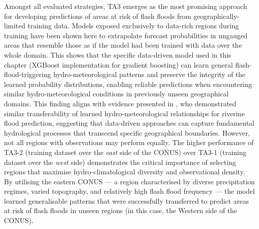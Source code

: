 Amongst  all evaluated strategies, TA3 emerges as the most promising approach for developing predictions of areas at risk of flash floods from geographically-limited training data. Models exposed exclusively to data-rich regions during training have been shown here to extrapolate forecast probabilities in ungauged areas that resemble those as if the model had been trained with data over the whole domain. This shows that the specific data-driven model used in this chapter (XGBoost implementation for gradient boosting) can learn general flash-flood-triggering hydro-meteorological patterns and preserve the integrity of the learned probability distributions, enabling reliable predictions when encountering similar hydro-meteorological conditions in previously unseen geographical domains. This finding aligns with evidence presented in \citet{Kratzert_2024}, who demonstrated similar transferability of learned hydro-meteorological relationships for riverine flood prediction, suggesting that data-driven approaches can capture fundamental hydrological processes that transcend specific geographical boundaries. However, not all regions with observations may perform equally. The higher performance of TA3-2 (training dataset over the \textit{east} side of the CONUS) over TA3-1 (training dataset over the \textit{west} side) demonstrates the critical importance of selecting regions that maximise hydro-climatological diversity and observational density. By utilising the eastern CONUS — a region characterised by diverse precipitation regimes, varied topography, and relatively high flash flood frequency — the model learned generalisable patterns that were successfully transferred to predict areas at risk of flash floods in unseen regions (in this case, the Western side of the CONUS). 

